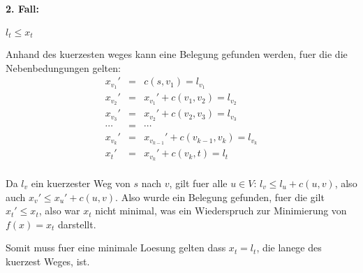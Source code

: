 \paragraph{2. Fall:} $l_t \leq x_t$

Anhand des kuerzesten weges kann eine Belegung gefunden werden, fuer die die Nebenbedungungen gelten: 
\begin{eqnarray}
    x_{v_1}' &=& c(s,v_1) = l_{v_1}\\
    x_{v_2}' &=& x_{v_1}' + c(v_1,v_2) = l_{v_2}\\
    x_{v_3}' &=& x_{v_2}' + c(v_2,v_3) = l_{v_3}\\
    \cdots  &=&  \cdots\\
    x_{v_k}' &=& x_{v_{k-1}}' + c(v_{k-1},v_k) = l_{v_k}\\
    x_t' &=&  x_{v_k}' + c(v_{k}, t) = l_t\\
\end{eqnarray}

Da $l_v$ ein kuerzester Weg von $s$ nach $v$, gilt fuer alle $u \in V$: $l_v \leq l_u + c(u,v)$, 
also auch $x_v' \leq x_u' + c(u,v)$. Also wurde ein Belegung gefunden, fuer die gilt
$x_t' \leq x_t$, also war $x_t$ nicht minimal, was ein Wiederspruch zur Minimierung von $f(x) = x_t$ darstellt.

Somit muss fuer eine minimale Loesung gelten dass $x_t = l_t$, die lanege des kuerzest Weges, ist.


